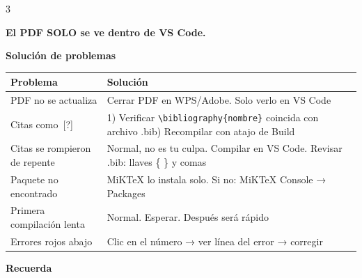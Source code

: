 \documentclass[10pt,a4paper,landscape]{article}
\newcommand{\sectiontitle}[2]{%
  \noindent\colorbox{accentblue}{\parbox{\dimexpr\linewidth-2\fboxsep}{%
    \centering\color{white}\bfseries\large #1\quad #2%
  }}%
  \vspace{6pt}%
}
\newcommand{\warningbox}[1]{%
  \noindent\colorbox{accentred!10}{\parbox{\dimexpr\linewidth-2\fboxsep}{%
    \color{accentred}\bfseries\faExclamationTriangle\quad #1%
  }}%
}
\begin{document}
\begin{multicols}{3}
\vspace{6pt}

\warningbox{El PDF SOLO se ve dentro de VS Code.}

\vspace{4pt}



\sectiontitle{\faWrench}{Solución de problemas}

\vspace{2pt}

\renewcommand{\arraystretch}{1.4}
{\small
\begin{tabularx}{\linewidth}{@{}>{\raggedright\arraybackslash}p{2.8cm}X@{}}
  \toprule
  \textbf{Problema} & \textbf{Solución} \\
  \midrule
  PDF no se actualiza & 
    Cerrar PDF en WPS/Adobe. Solo verlo en VS Code \\
  \addlinespace
  Citas como~{[?]} & 
    1) Verificar \texttt{\textbackslash bibliography\{nombre\}} coincida con archivo .bib\newline
    2) Recompilar con atajo de Build \\
  \addlinespace
  Citas se rompieron de repente &
    Normal, no es tu culpa. Compilar en VS Code. Revisar .bib: llaves \{ \} y comas \\
  \addlinespace
  Paquete no encontrado &
    MiKTeX lo instala solo. Si no: MiKTeX Console → Packages \\
  \addlinespace
  Primera compilación lenta &
    Normal. Esperar. Después será rápido \\
  \addlinespace
  Errores rojos abajo &
    Clic en el número → ver línea del error → corregir \\
  \bottomrule
\end{tabularx}
}

\vspace{10pt}

\sectiontitle{\faBookOpen}{Recuerda}


\end{multicols}
\end{document}
